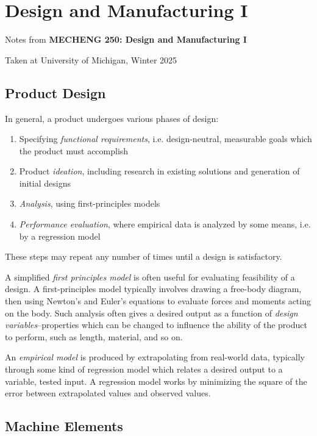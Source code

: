 \section{Design and Manufacturing I}

\begin{center}
    Notes from \textbf{MECHENG 250: Design and Manufacturing I}
    
    Taken at University of Michigan, Winter 2025
\end{center}

\subsection{Product Design}
In general, a product undergoes various phases of design: \begin{enumerate}
    \item Specifying \textit{functional requirements}, i.e. design-neutral, measurable goals which the product must accomplish
    \item Product \textit{ideation}, including research in existing solutions and generation of initial designs
    \item \textit{Analysis}, using first-principles models
    \item \textit{Performance evaluation}, where empirical data is analyzed by some means, i.e. by a regression model
\end{enumerate} These steps may repeat any number of times until a design is satisfactory.

A simplified \textit{first principles model} is often useful for evaluating feasibility of a design. A first-principles model typically involves drawing a free-body diagram, then using Newton's and Euler's equations to evaluate forces and moments acting on the body. Such analysis often gives a desired output as a function of \textit{design variables}--properties which can be changed to influence the ability of the product to perform, such as length, material, and so on.

An \textit{empirical model} is produced by extrapolating from real-world data, typically through some kind of regression model which relates a desired output to a variable, tested input. A regression model works by minimizing the square of the error between extrapolated values and observed values.

\newpage

\subsection{Machine Elements}

